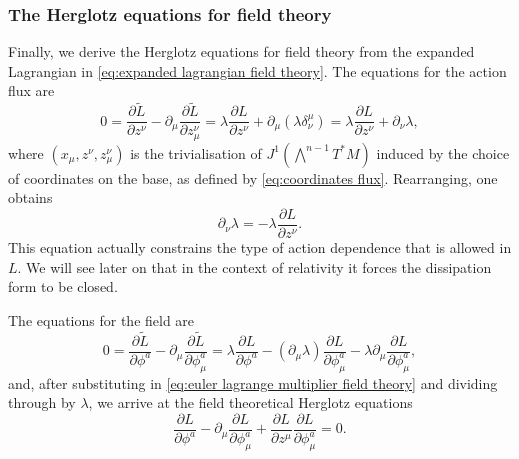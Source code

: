 \documentclass[../main.tex]{subfiles}
\begin{document}
\subsubsection{The Herglotz equations for field theory}
Finally, we derive the Herglotz equations for field theory from the expanded
Lagrangian  in \cref{eq:expanded lagrangian field theory}. The
equations for the action flux are
\begin{equation*}
	0 = \frac{\partial \tilde{L}}{\partial z^\nu} - \partial_\mu \frac{\partial
	\tilde{L}}{\partial z^\nu_\mu} = \lambda \frac{\partial L}{\partial z^\nu} +
	\partial_\mu(\lambda \delta_\nu^\mu) = \lambda \frac{\partial L}{\partial z^\nu} +
	\partial_\nu \lambda,
\end{equation*}
where \((x_\mu, z^\nu, z^\nu_\mu)\) is the trivialisation of \(J^1(\bigwedge^{n-1}T^\ast M) \) induced by the choice of coordinates on the base, as defined by \cref{eq:coordinates flux}.
Rearranging, one obtains
\begin{equation} \label{eq:euler lagrange multiplier field theory}
	\partial_\nu \lambda = - \lambda \frac{\partial L}{\partial z^\nu}. 
\end{equation}
This equation actually constrains the type of action dependence that is allowed
in \( L \). We will see later on that in the context of relativity it forces the
dissipation form to be closed. 

The equations for the field are
\begin{equation*}
	0 = \frac{\partial \tilde{L}}{\partial \phi^a} - \partial_\mu \frac{\partial
	\tilde{L}}{\partial\phi^a_\mu} = \lambda \frac{\partial L}{\partial \phi^a} -
	(\partial_\mu \lambda) \frac{\partial L}{\partial\phi^a_\mu} - \lambda
	\partial_\mu \frac{\partial L}{\partial\phi^a_\mu},
\end{equation*}
and, after substituting in \cref{eq:euler lagrange multiplier field theory} and dividing
through by \( \lambda \), we arrive at the field theoretical Herglotz equations
\begin{equation} \label{eq:herglotz field theory}
	\frac{\partial L}{\partial \phi^a} - \partial_\mu \frac{\partial
	L}{\partial\phi^a_\mu} + \frac{\partial L}{\partial z^\mu} \frac{\partial
L}{\partial\phi^a_\mu} = 0. 
\end{equation}
\end{document}
